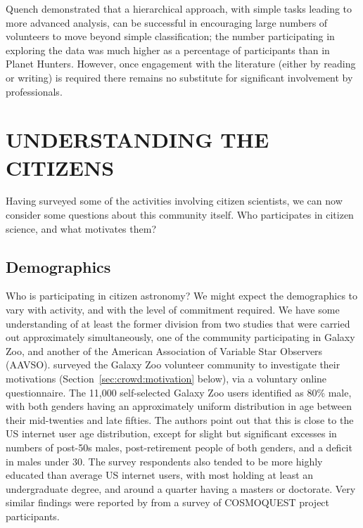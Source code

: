 \documentclass{ar2e}
\def\Sref#1{Section~\ref{#1}\xspace}
\def\CaseStudy#1{\noindent{\it\bf #1 \,\,\,\,}}
\begin{document}
Quench demonstrated that a hierarchical approach, with simple tasks leading to
more advanced analysis, can be successful in encouraging large numbers of
volunteers to move beyond simple classification; the number participating in
exploring the data was much higher as a percentage of participants than in
Planet Hunters. However, once engagement with the literature (either by reading
or writing) is required there remains no substitute for significant involvement
by professionals. 



% 




\section{UNDERSTANDING THE CITIZENS}
\label{sec:crowd}

Having surveyed some of the activities involving citizen scientists, we can
now consider some questions about this community itself. Who participates in
citizen science, and what motivates them?



\subsection{Demographics}
\label{sec:crowd:demographics}

Who is participating in citizen astronomy? We might expect the demographics to
vary with activity, and with the level of commitment required. We have some
understanding of at least the former division from two studies that were
carried out approximately simultaneously, one of the community  participating
in Galaxy Zoo, and another of the American Association of Variable Star
Observers (AAVSO).  \citet{Rad++2013} surveyed the Galaxy Zoo volunteer
community to investigate their motivations (\Sref{sec:crowd:motivation}
below), via a voluntary online questionnaire. The 11,000 self-selected Galaxy
Zoo users identified as 80\% male, with both genders having an approximately
uniform distribution in age between their mid-twenties and late fifties. The
authors point out that this is close to the US internet user age distribution,
except for slight but significant excesses in numbers of post-50s males,
post-retirement people of both genders, and a deficit in males under 30. The
survey respondents  also tended to be more highly educated than average US
internet users, with most holding at least an undergraduate degree, and around
a quarter having a masters or doctorate. Very similar findings were reported
by \citet{COSMOQUESTsurvey} from a survey of COSMOQUEST project participants.
\end{document}
